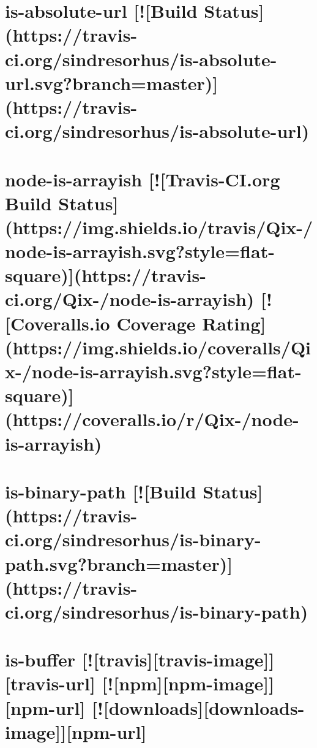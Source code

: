 \documentclass[twoside]{book}
\newcommand{\+}{\discretionary{\mbox{\scriptsize$\hookleftarrow$}}{}{}}
\begin{document}
\chapter{is-\/absolute-\/url \mbox{[}!\mbox{[}Build Status\mbox{]}(https\+://travis-\/ci.org/sindresorhus/is-\/absolute-\/url.svg?branch=master)\mbox{]}(https\+://travis-\/ci.org/sindresorhus/is-\/absolute-\/url)}
\label{md__c_1_workspace_demo_src_main_script_node_modules_is-absolute-url_readme}

\chapter{node-\/is-\/arrayish \mbox{[}!\mbox{[}Travis-\/\+CI.org Build Status\mbox{]}(https\+://img.shields.\+io/travis/\+Qix-\//node-\/is-\/arrayish.svg?style=flat-\/square)\mbox{]}(https\+://travis-\/ci.org/\+Qix-\//node-\/is-\/arrayish) \mbox{[}!\mbox{[}Coveralls.\+io Coverage Rating\mbox{]}(https\+://img.shields.\+io/coveralls/\+Qix-\//node-\/is-\/arrayish.svg?style=flat-\/square)\mbox{]}(https\+://coveralls.io/r/\+Qix-\//node-\/is-\/arrayish)}
\label{md__c_1_workspace_demo_src_main_script_node_modules_is-arrayish__r_e_a_d_m_e}

\chapter{is-\/binary-\/path \mbox{[}!\mbox{[}Build Status\mbox{]}(https\+://travis-\/ci.org/sindresorhus/is-\/binary-\/path.svg?branch=master)\mbox{]}(https\+://travis-\/ci.org/sindresorhus/is-\/binary-\/path)}
\label{md__c_1_workspace_demo_src_main_script_node_modules_is-binary-path_readme}

\chapter{is-\/buffer \mbox{[}!\mbox{[}travis\mbox{]}\mbox{[}travis-\/image\mbox{]}\mbox{]}\mbox{[}travis-\/url\mbox{]} \mbox{[}!\mbox{[}npm\mbox{]}\mbox{[}npm-\/image\mbox{]}\mbox{]}\mbox{[}npm-\/url\mbox{]} \mbox{[}!\mbox{[}downloads\mbox{]}\mbox{[}downloads-\/image\mbox{]}\mbox{]}\mbox{[}npm-\/url\mbox{]}}
\label{md__c_1_workspace_demo_src_main_script_node_modules_is-buffer__r_e_a_d_m_e}

\end{document}
